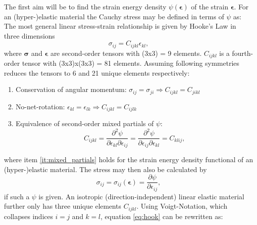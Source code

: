 \documentclass[m,times]{cgMA}
\begin{document}
The first aim will be to find the strain energy density $\psi(\mathbf{\epsilon})$ of the strain $\bm{\epsilon}$.
For an (hyper-)elastic material the Cauchy stress may be defined in terms of $\psi$ as:
The most general linear stress-strain relationship is given by Hooke's Law in three dimensions
\begin{equation}\label{eq:hook}
  \sigma_{ij} = C_{ijkl} \epsilon_{kl},
\end{equation}
where $\mathbf{\sigma}$ and $\bm{\epsilon}$ are second-order tensors with (3x3) = 9 elements. $C_{ijkl}$ is a fourth-order tensor with (3x3)x(3x3) = 81 elements.
Assuming following symmetries reduces the tensors to 6 and 21 unique elements respectively:
\begin{enumerate}
  \item Conservation of angular momentum: $\sigma_{ij} = \sigma_{ji} \Rightarrow C_{ijkl} = C_{jikl} $
  \item No-net-rotation: $\epsilon_{kl} = \epsilon_{lk} \Rightarrow C_{ijkl} = C_{ijlk}$
  \item \label{it:mixed_partials}Equivalence of second-order mixed partials of $\psi$:
    \begin{equation}
      C _ { i j k l } = \frac { \partial ^ { 2 } { \psi } } { \partial \epsilon _ { k l } \partial \epsilon _ { i j } } = \frac { \partial ^ { 2 } { \psi } } { \partial \epsilon _ { i j } \partial \epsilon _ { k l } } = C _ { k l i j },
    \end{equation}
\end{enumerate}
where item \ref{it:mixed_partials} holds for the strain energy density functional of an (hyper-)elastic material. The stress may then also be calculated by
\begin{equation}\label{eq:partial_energy}
  \sigma _ { i j } = \sigma _ { i j } ( \mathbf{\epsilon} ) = \frac { \partial { \psi } } { \partial \epsilon _ { i j } },
\end{equation}
if such a $\psi$ is given. An isotropic (direction-independent) linear elastic material further only has three unique elements $C _ {i j k l}$. Using Voigt-Notation, which collapses indices $i=j$ and $k=l$, equation \ref{eq:hook} can be rewritten as:
\end{document}
